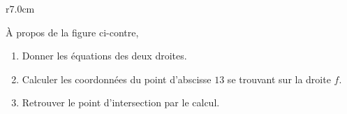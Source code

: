 
\begin{exercice}\label{exosmath-0413}

\begin{wrapfigure}{r}{7.0cm}
            \vspace{-3cm}        %
                \centering
                    
                \end{wrapfigure}

        À propos de la figure ci-contre, 
        \begin{enumerate}
            \item
                Donner les équations des deux droites.
            \item
                Calculer les coordonnées du point d'abscisse \( 13\) se trouvant sur la droite \( f\).
            \item
                Retrouver le point d'intersection par le calcul. 
        \end{enumerate}


\end{exercice}
